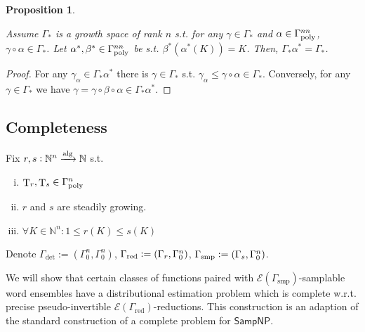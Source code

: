 \documentclass{article}
\numberwithin{equation}{section}
\theoremstyle{definition}
\theoremstyle{plain}
\newtheorem{proposition}{Proposition}[section]
\DeclareMathOperator{\T}{T}
\newcommand{\Nats}{\mathbb{N}}
\newcommand{\Fall}{\mathcal{E}}
\newcommand{\GammaPoly}{\Gamma_{\textnormal{poly}}}
\newcommand{\Alg}{\xrightarrow{\textnormal{alg}}}
\begin{document}
\begin{samepage}
\begin{proposition}
\label{prp:stable_growth_space}

Assume ${\Gamma_*}$ is a growth space of rank ${n}$ s.t. for any ${\gamma \in \Gamma_*}$ and ${\alpha \in \GammaPoly^{nn}}$, ${\gamma \circ \alpha \in \Gamma_*}$. Let ${\alpha^*, \beta^* \in \GammaPoly^{nn}}$ be s.t. ${\beta^*(\alpha^*(K))=K}$. Then, ${\Gamma_* \alpha^* = \Gamma_*}$.

\end{proposition}
\end{samepage}

\begin{proof}

For any ${\gamma_\alpha \in \Gamma_* \alpha^*}$ there is ${\gamma \in \Gamma_*}$ s.t. ${\gamma_\alpha \leq \gamma \circ \alpha \in \Gamma_*}$. Conversely, for any ${\gamma \in \Gamma_*}$ we have ${\gamma = \gamma \circ \beta \circ \alpha \in \Gamma_* \alpha^*}$.
%
\end{proof}

\subsection{Completeness}


Fix ${r,s: \Nats^n \Alg \Nats}$ s.t.

\begin{enumerate}[(i)]

\item ${\T_r, \T_s \in \GammaPoly^n}$

\item ${r}$ and ${s}$ are steadily growing.

\item ${\forall K \in \Nats^n: 1 \leq r(K) \leq s(K)}$

\end{enumerate}

Denote ${\Gamma_\text{det}:=(\Gamma_0^n,\Gamma_0^n)}$, ${\Gamma_{\textnormal{red}}:=(\Gamma_{r},\Gamma_0^n)}$, ${\Gamma_{\textnormal{smp}}:=(\Gamma_{s},\Gamma_0^n)}$.

We will show that certain classes of functions paired with ${\Fall(\Gamma_{\text{smp}})}$-samplable word ensembles have a distributional estimation problem which is complete w.r.t. precise pseudo-invertible ${\Fall(\Gamma_{\text{red}})}$-reductions. This construction is an adaption of the standard construction of a complete problem for ${\mathsf{SampNP}}$.
\end{document}
